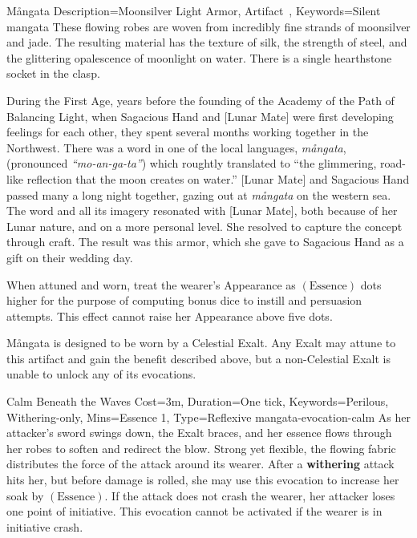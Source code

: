 ﻿

\begin{Merit}{Mångata}{
    Description={Moonsilver Light Armor, Artifact~},
    Keywords=Silent
}{mangata}
These flowing robes are woven from incredibly fine strands of moonsilver and
jade. The resulting material has the texture of silk, the strength of steel,
and the glittering opalescence of moonlight on water. There is a single
hearthstone socket in the clasp.

During the First Age, years before the founding of the Academy of the Path of
Balancing Light, when Sagacious Hand and [Lunar Mate] were first developing
feelings for each other, they spent several months working together in the
Northwest. There was a word in one of the local languages, \textit{mångata},
(pronounced \textit{``mo-an-ga-ta''}) which roughtly translated to ``the
glimmering, road-like reflection that the moon creates on water.'' [Lunar Mate]
and Sagacious Hand passed many a long night together, gazing out at
\textit{mångata} on the western sea. The word and all its imagery resonated
with [Lunar Mate], both because of her Lunar nature, and on a more personal
level. She resolved to capture the concept through craft. The result was this
armor, which she gave to Sagacious Hand as a gift on their wedding day.


When attuned and worn, treat the wearer's Appearance as $(\mathrm{Essence})$
dots higher for the purpose of computing bonus dice to instill and persuasion
attempts. This effect cannot raise her Appearance above five dots.

Mångata is designed to be worn by a Celestial Exalt. Any Exalt may attune to
this artifact and gain the benefit described above, but a non-Celestial Exalt
is unable to unlock any of its evocations.

\begin{Charm}{Calm Beneath the Waves}{
    Cost=3m,
    Duration=One tick,
    Keywords={Perilous, Withering-only},
    Mins=Essence 1,
    Type=Reflexive
}{mangata-evocation-calm}
As her attacker's sword swings down, the Exalt braces, and her essence flows
through her robes to soften and redirect the blow. Strong yet flexible, the
flowing fabric distributes the force of the attack around its wearer. After a
\textbf{withering} attack hits her, but before damage is rolled, she may use
this evocation to increase her soak by $(\mathrm{Essence})$. If the attack does
not crash the wearer, her attacker loses one point of initiative. This
evocation cannot be activated if the wearer is in initiative crash.
\end{Charm}


\end{Merit}
